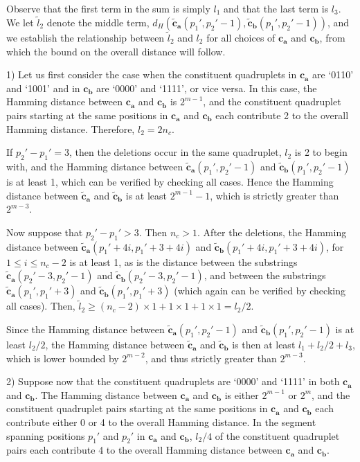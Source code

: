 Observe that the first term in the sum is simply $l_1$ and that
the last term is $l_3$. We let $\tilde{l}_2$ denote the middle
term,
$d_H\left(\mathbf{\tilde{c}_a}(p_1',p_2'-1),\mathbf{\tilde{c}_b}(p_1',p_2'-1)\right)$,
and we establish the relationship between $\tilde{l}_2$ and $l_2$
for all choices of $\mathbf{c_a}$ and $\mathbf{c_b}$, from which
the bound on the overall distance will follow.

1) Let us first consider the case when the constituent quadruplets
in $\mathbf{c_a}$ are `0110' and `1001' and in $\mathbf{c_b}$ are
`0000' and `1111', or vice versa. In this case, the Hamming
distance between $\mathbf{c_a}$ and $\mathbf{c_b}$ is $2^{m-1}$,
and the constituent quadruplet pairs starting at the same
positions in $\mathbf{c_a}$ and $\mathbf{c_b}$ each contribute 2
to the overall Hamming distance. Therefore, $l_2=2n_c$.

If $p_2'-p_1'=3$, then the deletions occur in the same quadruplet,
$l_2$ is 2 to begin with, and the Hamming distance between
$\mathbf{\tilde{c}_a}(p_1',p_2'-1)$ and
$\mathbf{\tilde{c}_b}(p_1',p_2'-1)$ is at least 1, which can be
verified by checking all cases. Hence the Hamming
distance between $\mathbf{\tilde{c}_a}$ and
$\mathbf{\tilde{c}_b}$ is at least
$2^{m-1} -1$, which is strictly greater
than $2^{m-3}$.

Now suppose that $p_2'-p_1'>3$. Then $n_c>1$. After the deletions,
the Hamming distance between
$\mathbf{\tilde{c}_a}(p_1'+4i,p_1'+3+4i)$ and
$\mathbf{\tilde{c}_b}(p_1'+4i,p_1'+3+4i)$, for $1 \leq i \leq
n_c-2$ is at least 1, as is the distance between the substrings
$\mathbf{\tilde{c}_a}(p_2'-3,p_2'-1)$ and
$\mathbf{\tilde{c}_b}(p_2'-3,p_2'-1)$, and between the substrings
$\mathbf{\tilde{c}_a}(p_1',p_1'+3)$ and
$\mathbf{\tilde{c}_b}(p_1',p_1'+3)$ (which again can be verified
by checking all cases). Then, $\tilde{l}_2 \geq (n_c-2)\times 1 +
1\times 1 +1\times 1=l_2/2$.

Since the Hamming distance between
$\mathbf{\tilde{c}_a}(p_1',p_2'-1)$ and
$\mathbf{\tilde{c}_b}(p_1',p_2'-1)$ is at least $l_2/2$,
the Hamming distance between $\mathbf{\tilde{c}_a}$ and
$\mathbf{\tilde{c}_b}$ is then at least $l_1+l_2/2+l_3$, which is
lower bounded by $2^{m-2}$, and thus strictly greater than
$2^{m-3}$.


2) Suppose now that the constituent quadruplets are `0000' and
`1111' in both $\mathbf{c_a}$ and $\mathbf{c_b}$. The Hamming
distance between $\mathbf{c_a}$ and $\mathbf{c_b}$ is either
$2^{m-1}$ or $2^m$, and the constituent quadruplet pairs starting
at the same positions in $\mathbf{c_a}$ and $\mathbf{c_b}$ each
contribute either 0 or 4 to the overall Hamming distance. In the
segment spanning positions $p_1'$ and $p_2'$ in $\mathbf{c_a}$ and
$\mathbf{c_b}$, $l_2/4$ of the constituent quadruplet pairs each
contribute 4 to the overall Hamming distance between
$\mathbf{c_a}$ and $\mathbf{c_b}$.

